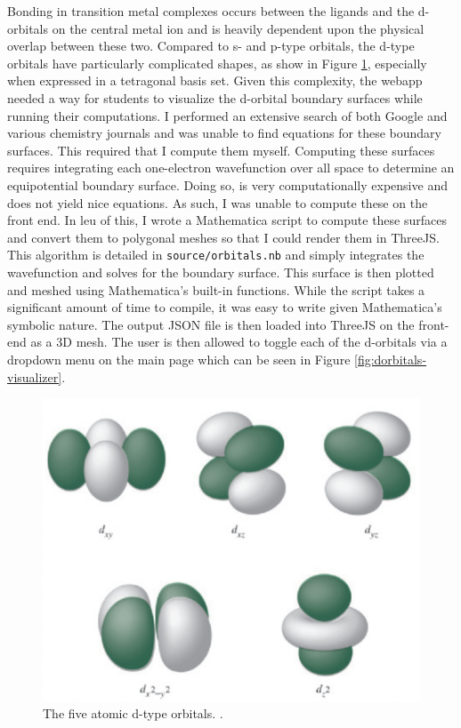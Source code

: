 \documentclass[10pt,twocolumn]{article}
\begin{document}
Bonding in transition metal complexes occurs between the ligands and the d-orbitals on the central metal ion and is heavily dependent upon the physical overlap between these two. Compared to s- and p-type orbitals, the d-type orbitals have particularly complicated shapes, as show in Figure \ref{fig:dorbitals}, especially when expressed in a tetragonal basis set. Given this complexity, the webapp needed a way for students to visualize the d-orbital boundary surfaces while running their computations. I performed an extensive search of both Google and various chemistry journals and was unable to find equations for these boundary surfaces. This required that I compute them myself. Computing these surfaces requires integrating each one-electron wavefunction over all space to determine an equipotential boundary surface. Doing so, is very computationally expensive and does not yield nice equations. As such, I was unable to compute these on the front end. In leu of this, I wrote a Mathematica script to compute these surfaces and convert them to polygonal meshes so that I could render them in ThreeJS. This algorithm is detailed in \texttt{source/orbitals.nb} and simply integrates the wavefunction and solves for the boundary surface. This surface is then plotted and meshed using Mathematica’s built-in functions. While the script takes a significant amount of time to compile, it was easy to write given Mathematica’s symbolic nature. The output JSON file is then loaded into ThreeJS on the front-end as a 3D mesh. The user is then allowed to toggle each of the d-orbitals via a dropdown menu on the main page which can be seen in Figure \ref{fig:dorbitals-visualizer}.

\begin{figure}
	\centering
	\includegraphics[width=.95\linewidth]{dorbitals.png}
	\caption{
		The five atomic d-type orbitals. \cite{miessler_inorganic_2014}.
	}
	\label{fig:dorbitals}
\end{figure}
\end{document}
